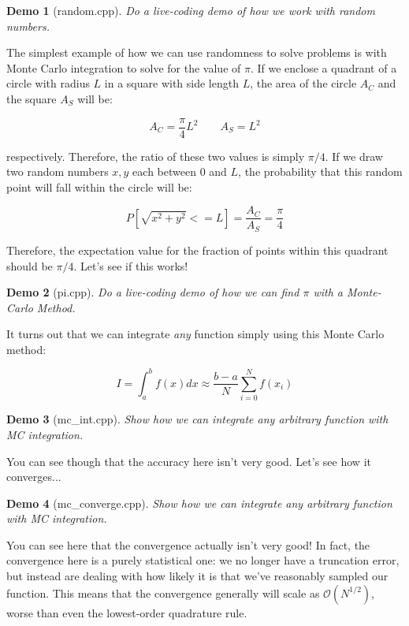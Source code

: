 \documentclass{article}
\theoremstyle{demo}
\newtheorem{demo}{Demo}[section]
\begin{document}
\begin{demo}[random.cpp]
    Do a live-coding demo of how we work with random numbers.
\end{demo}

The simplest example of how we can use randomness to solve problems is with
Monte Carlo integration to solve for the value of $\pi$.  If we enclose a
quadrant of a circle with radius $L$ in a square with side length $L$, the area
of the circle $A_C$ and the square $A_S$ will be:

\begin{equation}
    A_C = \frac{\pi}{4}L^2 \qquad A_S = L^2
\end{equation}

respectively.  Therefore, the ratio of these two values is simply $\pi/4$.  If
we draw two random numbers $x,y$ each between 0 and $L$, the probability that
this random point will fall within the circle will be:

\begin{equation}
    P[\sqrt{x^2+y^2} <= L] = \frac{A_C}{A_S} = \frac{\pi}{4}
\end{equation}

Therefore, the expectation value for the fraction of points within this quadrant
should be $\pi/4$.  Let's see if this works!

\begin{demo}[pi.cpp]
    Do a live-coding demo of how we can find $\pi$ with a Monte-Carlo Method.
\end{demo}

It turns out that we can integrate \textit{any} function simply using this Monte
Carlo method:

\begin{equation}
    I = \int_a^b f(x) dx \approx \frac{b-a}{N} \sum_{i=0}^N f(x_i)
\end{equation}

\begin{demo}[mc\_int.cpp]
    Show how we can integrate any arbitrary function with MC integration.
\end{demo}

You can see though that the accuracy here isn't very good. Let's see how it
converges...

\begin{demo}[mc\_converge.cpp]
    Show how we can integrate any arbitrary function with MC integration.
\end{demo}

You can see here that the convergence actually isn't very good!  In fact, the
convergence here is a purely statistical one: we no longer have a truncation
error, but instead are dealing with how likely it is that we've reasonably
sampled our function.  This means that the convergence generally will scale as
$\mathcal{O}(N^{1/2})$, worse than even the lowest-order quadrature rule.
\end{document}
